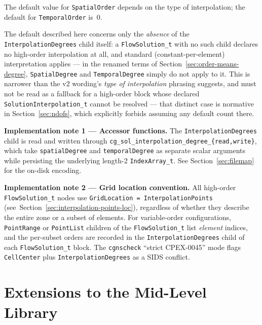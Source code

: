 \documentclass[11pt,letterpaper]{article}
\newenvironment{v2quote}
  {\begin{v2quoteframe}%
   \noindent{\footnotesize\sffamily\bfseries\color{cgnsblue}v2 text}%
   \nopagebreak\par\nopagebreak\vspace{0.15em}}
  {\end{v2quoteframe}}
\begin{document}
\begin{v2quote}
The default value for \texttt{SpatialOrder} depends on the type of interpolation; the default
for \texttt{TemporalOrder} is~0.
\end{v2quote}

\noindent The default described here concerns only the \emph{absence} of the
\texttt{InterpolationDegrees} child itself: a \texttt{FlowSolution\_t} with no such
child declares no high-order interpolation at all, and standard (constant-per-element)
interpretation applies --- in the renamed terms of Section~\ref{sec:order-means-degree},
\texttt{SpatialDegree} and \texttt{TemporalDegree} simply do not apply to it.  This is
narrower than the v2 wording's \emph{type of interpolation} phrasing suggests, and must
not be read as a fallback for a high-order block whose declared
\texttt{SolutionInterpolation\_t} cannot be resolved --- that distinct case is normative
in Section~\ref{sec:ndofs}, which explicitly forbids assuming any default count there.

\noindent\textbf{Implementation note 1 --- Accessor functions.}
The \texttt{InterpolationDegrees} child is read and written through
\texttt{cg\_sol\_interpolation\_degree\_\{read,write\}}, which take \texttt{spatialDegree}
and \texttt{temporalDegree} as separate scalar arguments while persisting the underlying
length-2 \texttt{IndexArray\_t}.  See Section~\ref{sec:filemap} for the on-disk encoding.

\noindent\textbf{Implementation note 2 --- Grid location convention.}
All high-order \texttt{FlowSolution\_t} nodes use \texttt{GridLocation =
InterpolationPoints} (see~Section~\ref{sec:interpolation-points-loc}), regardless
of whether they describe the entire zone or a subset of elements.  For variable-order
configurations, \texttt{PointRange} or \texttt{PointList} children of the
\texttt{FlowSolution\_t} list \emph{element} indices, and the per-subset orders are
recorded in the \texttt{InterpolationDegrees} child of each \texttt{FlowSolution\_t}
block.  The \texttt{cgnscheck} ``strict CPEX-0045'' mode flags \texttt{CellCenter}
plus \texttt{InterpolationDegrees} as a SIDS conflict.


\section{Extensions to the Mid-Level Library}
\end{document}
